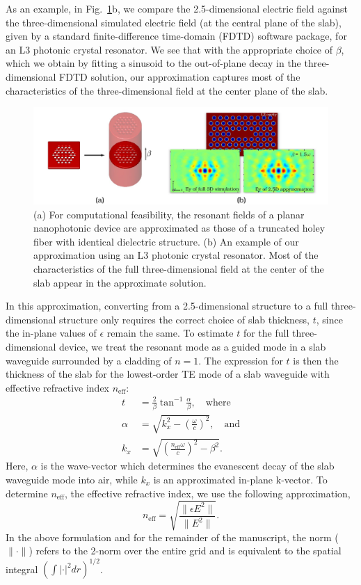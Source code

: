 \documentclass[10pt,letterpaper]{article}
\begin{document}
As an example, in Fig.~\ref{approx}b, we compare the 2.5-dimensional electric field against the three-dimensional simulated electric field (at the central plane of the slab), given by a standard finite-difference time-domain (FDTD) software package, for an L3 photonic crystal resonator. We see that with the appropriate choice of $\beta$, which we obtain by fitting a sinusoid to the out-of-plane decay in the three-dimensional FDTD solution, our approximation captures most of the characteristics of the three-dimensional field at the center plane of the slab. 
\begin{figure}[hbt]
\centering\includegraphics[width=\textwidth]{approx}
\caption{(a) For computational feasibility, the resonant fields of a planar nanophotonic device are approximated as those of a truncated holey fiber with identical dielectric structure. (b) An example of our approximation using an L3 photonic crystal resonator. Most of the characteristics of the full three-dimensional field at the center of the slab appear in the approximate solution.}\label{approx}
\end{figure}

In this approximation, converting from a 2.5-dimensional structure to a full three-dimensional structure only requires the correct choice of slab thickness, $t$, since the in-plane values of $\epsilon$ remain the same. To estimate $t$ for the full three-dimensional device, we treat the resonant mode as a guided mode in a slab waveguide surrounded by a cladding of $n=1$. The expression for $t$ is then the thickness of the slab for the lowest-order TE mode of a slab waveguide with effective refractive index $n_\text{eff}$\cite{inan}:
\begin{align}
t &= \frac{2}{\beta}\tan^{-1}\frac{\alpha}{\beta},\label{t} \quad\text{where} \\
\alpha &= \sqrt{k_x^2 - \left(\frac{\omega}{c}\right)^2}, \quad\text{and} \\
k_x &= \sqrt{\left(\frac{n_\text{eff}\omega}{c}\right)^2 - \beta^2}.
\end{align}
Here, $\alpha$ is the wave-vector which determines the evanescent decay of the slab waveguide mode into air, while $k_x$ is an approximated in-plane k-vector. To determine $n_\text{eff}$, the effective refractive index, we use the following approximation,
\begin{equation}
n_\text{eff} = \sqrt{\frac{\|\epsilon E^2\|}{\|E^2\|}}.
\end{equation}
In the above formulation and for the remainder of the manuscript, the norm ($\|\cdot\|$) refers to the 2-norm over the entire grid and is equivalent to the spatial integral $(\int | \cdot |^2 dr)^{1/2}$.
\end{document}
